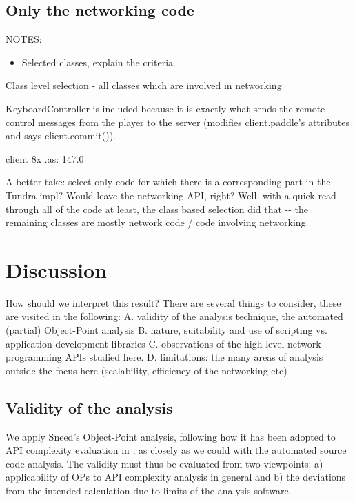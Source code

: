 \documentclass[conference]{IEEEtran}
\begin{document}
\subsection{Only the networking code%
  \label{only-the-networking-code}%
}

NOTES:
%
\begin{itemize}

\item Selected classes, explain the criteria.

\end{itemize}

Class level selection - all classes which are involved in networking

KeyboardController is included because it is exactly what sends the
remote control messages from the player to the server (modifies
client.paddle's attributes and says client.commit()).

client 8x .as: 147.0

A better take: select only code for which there is a corresponding
part in the Tundra impl? Would leave the networking API, right? Well,
with a quick read through all of the code at least, the class based
selection did that -{}- the remaining classes are mostly network code /
code involving networking.


\section{Discussion%
  \label{discussion}%
}

How should we interpret this result? There are several things to
consider, these are visited in the following: A. validity of the
analysis technique, the automated (partial) Object-Point
analysis B. nature, suitability and use of scripting vs. application
development libraries C. observations of the high-level network
programming APIs studied here. D. limitations: the many areas of
analysis outside the focus here (scalability, efficiency of the
networking etc)


\subsection{Validity of the analysis%
  \label{validity-of-the-analysis}%
}

We apply Sneed's Object-Point analysis, following how it has been
adopted to API complexity evaluation in \cite{api-complexity-analysis}, as
closely as we could with the automated source code analysis. The
validity must thus be evaluated from two viewpoints: a) applicability
of OPs to API complexity analysis in general and b) the deviations
from the intended calculation due to limits of the analysis software.
\end{document}
